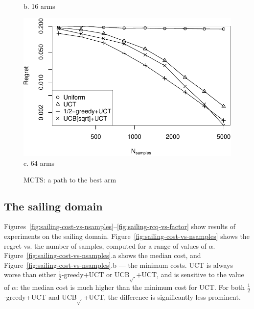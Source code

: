 \documentclass[letterpaper]{article}
\begin{document}
\begin{figure}[h!]
\begin{minipage}[c]{1.0\linewidth}
    b. 16 arms
    \vspace{1em}
  \end{minipage}
  \begin{minipage}[c]{1.0\linewidth}
    \centering
    \includegraphics[scale=0.5]{tree-identity-k=64-uqb=8.pdf} \\
    c. 64 arms
  \end{minipage}
  \label{fig:mcts-regret}
  \caption{MCTS: a path to the best arm}
\end{figure}

\subsection{The sailing domain}
\label{sec:emp-sailing}

Figures~\ref{fig:sailing-cost-vs-nsamples}--\ref{fig:sailing-rcq-vs-factor}
show results of experiments on the sailing
domain. Figure~\ref{fig:sailing-cost-vs-nsamples} shows the regret
vs. the number of samples, computed for a range of values of
$\alpha$. Figure~\ref{fig:sailing-cost-vs-nsamples}.a shows the median
cost, and Figure~\ref{fig:sailing-cost-vs-nsamples}.b --- the minimum
costs. UCT is always worse than either $\frac 1 2$-greedy+UCT or
UCB$_{\sqrt{\cdot}}$+UCT, and is sensitive to the value of $\alpha$: the median cost is
much higher than the minimum cost for UCT. For both $\frac 1 2$-greedy+UCT
and UCB$_{\sqrt{\cdot}}$+UCT, the difference is significantly less prominent.
\end{document}

